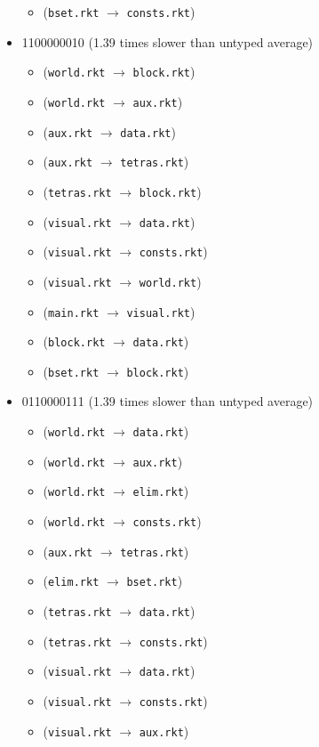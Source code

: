 \documentclass{article}
\newcommand{\mono}[1]{\texttt{#1}}
\begin{document}
\begin{itemize}
\begin{itemize}
  \item (\mono{bset.rkt} $\rightarrow$ \mono{consts.rkt})
  \end{itemize}
\item 1100000010 (1.39 times slower than untyped average)
  \begin{itemize}
  \item (\mono{world.rkt} $\rightarrow$ \mono{block.rkt})
  \item (\mono{world.rkt} $\rightarrow$ \mono{aux.rkt})
  \item (\mono{aux.rkt} $\rightarrow$ \mono{data.rkt})
  \item (\mono{aux.rkt} $\rightarrow$ \mono{tetras.rkt})
  \item (\mono{tetras.rkt} $\rightarrow$ \mono{block.rkt})
  \item (\mono{visual.rkt} $\rightarrow$ \mono{data.rkt})
  \item (\mono{visual.rkt} $\rightarrow$ \mono{consts.rkt})
  \item (\mono{visual.rkt} $\rightarrow$ \mono{world.rkt})
  \item (\mono{main.rkt} $\rightarrow$ \mono{visual.rkt})
  \item (\mono{block.rkt} $\rightarrow$ \mono{data.rkt})
  \item (\mono{bset.rkt} $\rightarrow$ \mono{block.rkt})
  \end{itemize}
\item 0110000111 (1.39 times slower than untyped average)
  \begin{itemize}
  \item (\mono{world.rkt} $\rightarrow$ \mono{data.rkt})
  \item (\mono{world.rkt} $\rightarrow$ \mono{aux.rkt})
  \item (\mono{world.rkt} $\rightarrow$ \mono{elim.rkt})
  \item (\mono{world.rkt} $\rightarrow$ \mono{consts.rkt})
  \item (\mono{aux.rkt} $\rightarrow$ \mono{tetras.rkt})
  \item (\mono{elim.rkt} $\rightarrow$ \mono{bset.rkt})
  \item (\mono{tetras.rkt} $\rightarrow$ \mono{data.rkt})
  \item (\mono{tetras.rkt} $\rightarrow$ \mono{consts.rkt})
  \item (\mono{visual.rkt} $\rightarrow$ \mono{data.rkt})
  \item (\mono{visual.rkt} $\rightarrow$ \mono{consts.rkt})
  \item (\mono{visual.rkt} $\rightarrow$ \mono{aux.rkt})

\end{itemize}
\end{itemize}
\end{document}
